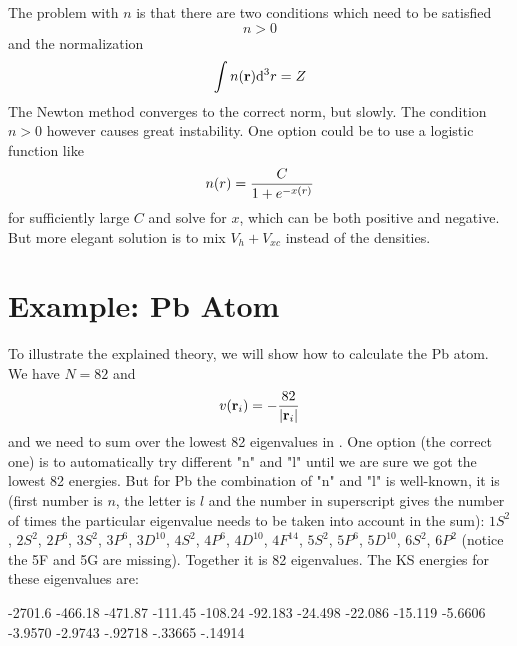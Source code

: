The problem with $n$ is that there are two conditions which need to be
satisfied
$$n>0$$
and the normalization
$$\int n({\bf r}) {\rm d}^3r=Z$$
The Newton method converges to the correct norm, but slowly. The condition
$n>0$ however causes great instability. One option could be to use a logistic
function like
$$n(r)={C\over 1+e^{-x(r)}}$$
for sufficiently large $C$ and solve for $x$, which can be both positive and
negative. But more elegant solution is to mix $V_h+V_{xc}$ instead of the
densities.

\section{Example: Pb Atom}

To illustrate the explained theory, we will show how to calculate the Pb atom.
We have $N=82$ and
$$v({\bf r}_i)=-{82\over |{\bf r}_i|}$$
and we need to sum over the lowest 82 eigenvalues in . One
option (the correct one) is to automatically try different "n" and "l" until we
are sure we got the lowest 82 energies. But for Pb the combination of "n" and
"l" is well-known, it is
(first number is
$n$, the letter is $l$ and the number in superscript gives the number of
times the particular eigenvalue needs to be taken into account in the sum):
$1S^2$, $2S^2$, $2P^6$, $3S^2$, $3P^6$, $3D^{10}$, $4S^2$, $4P^6$, $4D^{10}$,
$4F^{14}$, $5S^2$, $5P^6$, $5D^{10}$, $6S^2$, $6P^2$
(notice the 5F and 5G are missing). Together it is 82 eigenvalues. 
The KS energies for these eigenvalues are:

-2701.6    -466.18    -471.87    -111.45    -108.24    -92.183
-24.498    -22.086    -15.119    -5.6606    -3.9570
 -2.9743    -.92718    -.33665    -.14914
